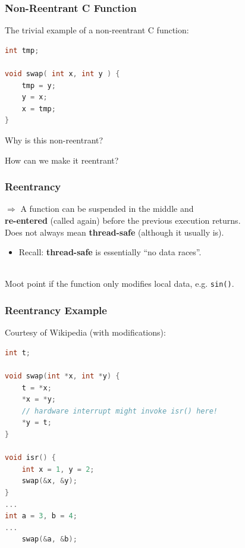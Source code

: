 \begin{frame}[fragile]
\frametitle{Non-Reentrant C Function}

The trivial example of a non-reentrant C function:

\begin{lstlisting}[language=C]
int tmp;

void swap( int x, int y ) {
    tmp = y;
    y = x;
    x = tmp;
}
\end{lstlisting}

Why is this non-reentrant?

How can we make it reentrant?

\end{frame}

\begin{frame}
  \frametitle{Reentrancy}

  
    $\Rightarrow$ A function can be suspended in the middle and \\ {\bf re-entered}
      (called again) before the previous execution returns.\\[1em]
    
     Does not always mean {\bf thread-safe} (although it usually is).
      \begin{itemize}
        \item Recall: {\bf thread-safe} is essentially ``no data races''.
      \end{itemize}
 ~\\[1em]
  Moot point if the function only modifies local data, e.g. {\tt sin()}.
  
\end{frame}

\begin{frame}[fragile]
  \frametitle{Reentrancy Example}

  

  Courtesy of Wikipedia (with modifications):
  \begin{lstlisting}[language=C]
int t;
 
void swap(int *x, int *y) {
    t = *x;
    *x = *y;
    // hardware interrupt might invoke isr() here!
    *y = t;
}
 
void isr() {
    int x = 1, y = 2;
    swap(&x, &y);
}
...
int a = 3, b = 4;
...
    swap(&a, &b);
  \end{lstlisting}
  
\end{frame}

